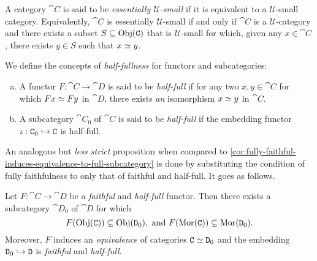 \begin{definition}
    \label{def:essentially-U-small}
    A category \(\cat C\) is said to be \emph{essentially \(\mathcal{U}\)-small} if
    it is equivalent to a \(\mathcal{U}\)-small category. Equivalently, \(\cat C\)
    is essentially \(\mathcal{U}\)-small if and only if \(\cat C\) is a
    \(\mathcal{U}\)-category and there exists a subset \(S \subseteq \operatorname{Obj}(\texttt C)\)
    that is \(\mathcal{U}\)-small for which, given any \(x \in \cat C\), there
    exists \(y \in S\) such that \(x \simeq y\).
\end{definition}

\begin{definition}
    \label{def:half-full}
    We define the concepts of \emph{half-fullness} for functors and subcategories:
    \begin{enumerate}[(a)]\setlength\itemsep{0em}
        \item A functor \(F: \cat C \to \cat D\) is said to be \emph{half-full} if for
              any two \(x, y \in \cat C\) for which \(F x \simeq F y\) in \(\cat D\), there
              exists \emph{an} isomorphism \(x \simeq y\) in \(\cat C\).

        \item A subcategory \(\cat C_0\) of \(\cat C\) is said to be \emph{half-full} if
              the embedding functor \(\iota: \texttt C_0 \hookrightarrow \texttt C\) is half-full.
    \end{enumerate}
\end{definition}

An analogous but \emph{less strict} proposition when compared to
\cref{cor:fully-faithful-induces-equivalence-to-full-subcategory} is done by
substituting the condition of fully faithfulness to only that of faithful and
half-full. It goes as follows.

\begin{proposition}
    \label{prop:faithful-half-full-induces-equivalence-to-subcategory}
    Let \(F: \cat C \to \cat D\) be a \emph{faithful} and \emph{half-full}
    functor. Then there exists a subcategory \(\cat D_0\) of \(\cat D\) for which
    \[
        F(\operatorname{Obj}(\texttt C)) \subseteq \operatorname{Obj}(\texttt D_0),
        \text{ and }
        F(\operatorname{Mor}(\texttt C)) \subseteq \operatorname{Mor}(\texttt D_0).
    \]
    Moreover, \(F\) induces an \emph{equivalence} of categories
    \(\texttt C \simeq \texttt D_0\) and the embedding
    \(\texttt D_0 \hookrightarrow \texttt D\) is \emph{faithful} and
    \emph{half-full}.
\end{proposition}

